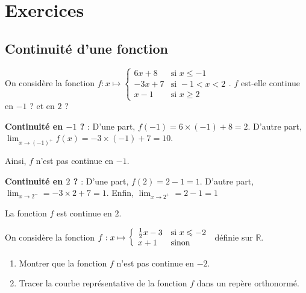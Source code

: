 \documentclass[11pt,fleqn, openany]{book} %
\begin{document}

\chapter{Exercices}

\section*{Continuité d'une fonction}

\begin{exercise} On considère la fonction \renewcommand{\arraystretch}{1}$f:x\mapsto \left\{ \begin{array}{ll}
6x+8 & \text{si }x\leqslant -1\\
-3x+7 & \text{si }-1< x < 2\\
x-1 & \text{si } x \geqslant 2
\end{array}\right. .$  $f$ est-elle continue en $-1$ ? et en $2$ ?
\end{exercise}

\begin{solution}

\textbf{Continuité en $-1$ ?} :  D'une part, $f(-1)=6\times (-1)+8=2$. D'autre part, $\displaystyle \lim_{x \to (-1)^+} f(x)= -3 \times (-1) +7=10$.

Ainsi, $f$ n'est pas continue en $-1$.

\textbf{Continuité en $2$ ?} : D'une part, $f(2)=2-1=1$. D'autre part, $\displaystyle \lim _{x \to 2^-}=-3\times 2 + 7 = 1$. Enfin, $\displaystyle \lim _{x \to 2^+}=2-1= 1$

La fonction $f$ est continue en $2$.\end{solution}



\begin{exercise}On considère la fonction $f:x\mapsto \left\{ \renewcommand{\arraystretch}{1} \begin{array}{ll}
\frac{1}{2}x -3 & \text{si }x\leqslant -2\\
x+1 & \text{sinon }
\end{array}\right.$ définie sur $\mathbb{R}$.
\vskip10pt
\begin{enumerate}
\item Montrer que la fonction $f$ n'est pas continue en $-2$.
\item Tracer la courbe représentative de la fonction $f$ dans un repère orthonormé.
\end{enumerate}\end{exercise}
\end{document}
